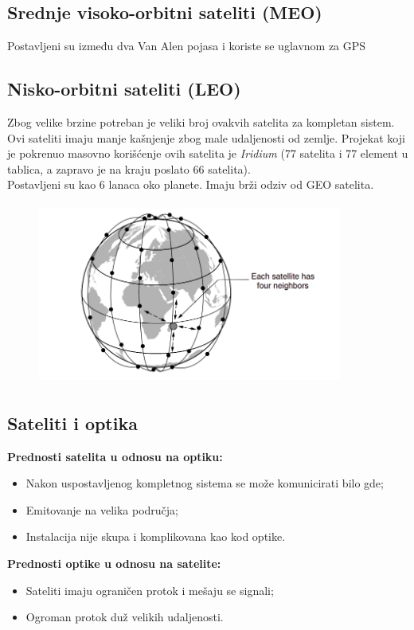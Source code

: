 \documentclass[a4paper]{article}
\begin{document}
        \subsection{Srednje visoko-orbitni sateliti (MEO)}
            Postavljeni su između dva Van Alen pojasa i koriste se uglavnom za GPS
        \subsection{Nisko-orbitni sateliti (LEO)}
            Zbog velike brzine potreban je veliki broj ovakvih satelita za kompletan sistem. Ovi 
            sateliti imaju manje kašnjenje zbog male udaljenosti od zemlje. Projekat koji je pokrenuo
            masovno korišćenje ovih satelita je \textit{Iridium} (77 satelita i 77 element u tablica, a
            zapravo je na kraju poslato 66 satelita). \\
            \indent Postavljeni su kao 6 lanaca oko planete. Imaju brži odziv od GEO satelita.
            \begin{figure}[H]
                \begin{center}
                    \includegraphics[width=100mm,height=60mm]{Slike/leo.png}
                \end{center}
            \end{figure}
        \subsection{Sateliti i optika}
            \noindent \textbf{Prednosti satelita u odnosu na optiku:}
            \begin{itemize}
                \item Nakon uspostavljenog kompletnog sistema se može komunicirati bilo gde;
                \item Emitovanje na velika područja;
                \item Instalacija nije skupa i komplikovana kao kod optike.
            \end{itemize}
            \textbf{Prednosti optike u odnosu na satelite:}
            \begin{itemize}
                \item Sateliti imaju ograničen protok i mešaju se signali;
                \item Ogroman protok duž velikih udaljenosti.
            \end{itemize}
\end{document}
